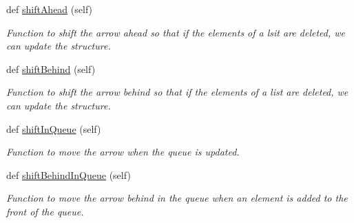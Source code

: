 \begin{DoxyCompactItemize}
\mbox{\label{classheaders_for_data_structures_1_1right_arrow_a3a9f5debd35ed66cc2b3a7c64397d530}} 
def \hyperlink{classheaders_for_data_structures_1_1right_arrow_a3a9f5debd35ed66cc2b3a7c64397d530}{shift\+Ahead} (self)
\begin{DoxyCompactList}\small\item\em Function to shift the arrow ahead so that if the elements of a lsit are deleted, we can update the structure. \end{DoxyCompactList}\item 
\mbox{\label{classheaders_for_data_structures_1_1right_arrow_a3e9d01ac5c06f2c21facde8562303d8f}} 
def \hyperlink{classheaders_for_data_structures_1_1right_arrow_a3e9d01ac5c06f2c21facde8562303d8f}{shift\+Behind} (self)
\begin{DoxyCompactList}\small\item\em Function to shift the arrow behind so that if the elements of a list are deleted, we can update the structure. \end{DoxyCompactList}\item 
\mbox{\label{classheaders_for_data_structures_1_1right_arrow_a70f3a761d27bd00ff60b71bd4457752d}} 
def \hyperlink{classheaders_for_data_structures_1_1right_arrow_a70f3a761d27bd00ff60b71bd4457752d}{shift\+In\+Queue} (self)
\begin{DoxyCompactList}\small\item\em Function to move the arrow when the queue is updated. \end{DoxyCompactList}\item 
\mbox{\label{classheaders_for_data_structures_1_1right_arrow_a89971076429e090ee142a0ac82dd51ce}} 
def \hyperlink{classheaders_for_data_structures_1_1right_arrow_a89971076429e090ee142a0ac82dd51ce}{shift\+Behind\+In\+Queue} (self)
\begin{DoxyCompactList}\small\item\em Function to move the arrow behind in the queue when an element is added to the front of the queue. \end{DoxyCompactList}\end{DoxyCompactItemize}

